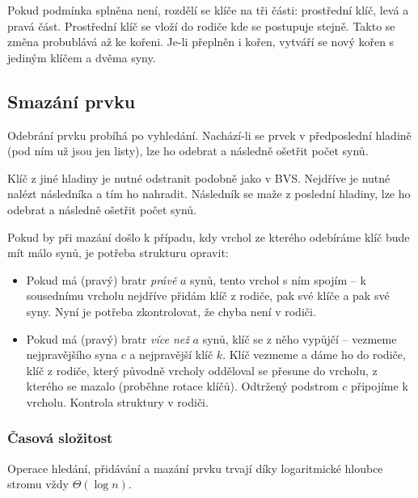 Pokud podmínka splněna není, rozdělí se klíče na tři části: prostřední klíč, levá a pravá část.
Prostřední klíč se vloží do rodiče kde se postupuje stejně.
Takto se změna probublává až ke kořeni.
Je-li přeplněn i kořen, vytváří se nový kořen s jediným klíčem a dvěma syny.


\subsection{Smazání prvku}

Odebrání prvku probíhá po vyhledání.
Nachází-li se prvek v předposlední hladině (pod ním už jsou jen listy), lze ho odebrat a následně ošetřit počet synů.

Klíč z jiné hladiny je nutné odstranit podobně jako v BVS.
Nejdříve je nutné nalézt následníka a tím ho nahradit.
Následník se maže z poslední hladiny, lze ho odebrat a následně ošetřit počet synů.

Pokud by při mazání došlo k případu, kdy vrchol ze kterého odebíráme klíč bude mít málo synů, je potřeba strukturu opravit:

\begin{itemize}
    \item Pokud má (pravý) bratr \textit{právě} $a$ synů, tento vrchol s ním spojím -- k sousednímu vrcholu nejdříve přidám klíč z rodiče, pak své klíče a pak své syny.
        Nyní je potřeba zkontrolovat, že chyba není v rodiči.
    
    \item Pokud má (pravý) bratr \textit{více než} $a$ synů, klíč se z něho vypůjčí -- vezmeme nejpravějšího syna $c$ a nejpravější klíč $k$.
        Klíč vezmeme a dáme ho do rodiče, klíč z rodiče, který původně vrcholy odděloval se přesune do vrcholu, z kterého se mazalo (proběhne rotace klíčů).
        Odtržený podstrom $c$ připojíme k vrcholu.
        Kontrola struktury v rodiči.
\end{itemize}

\subsubsection{Časová složitost}

Operace hledání, přidávání a mazání prvku trvají díky logaritmické hloubce stromu vždy $\Theta(\log n)$.
